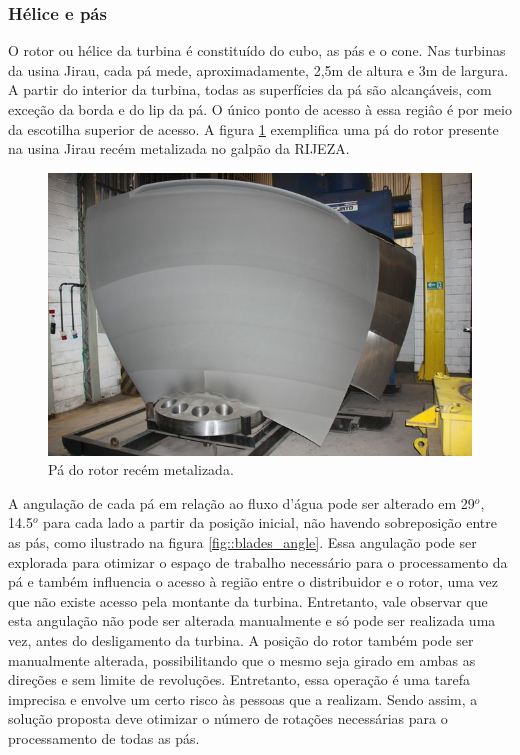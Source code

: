 \subsubsection{Hélice e pás}
 
O rotor ou hélice da turbina é constituído do cubo, as pás e o cone. 
Nas turbinas da usina Jirau, cada pá mede, aproximadamente, 2,5m de altura e
3m de largura. A partir do interior da turbina, todas as superfícies da pá são
alcançáveis, com exceção da borda e do lip da pá. O único ponto de acesso à
essa regiâo é por meio da escotilha superior de acesso. A figura
\ref{fig::blade_rijeza} exemplifica uma pá do rotor presente na usina Jirau recém metalizada no galpão da RIJEZA.

\begin{figure}[h!]
	\centering	
	\includegraphics[width=0.7\columnwidth]{sota/figs/viagem/img_4887}
	\caption{Pá do rotor recém metalizada.}
	\label{fig::blade_rijeza}
\end{figure}

A angulação de cada pá em relação ao fluxo d'água pode ser alterado em 29$^o$,
14.5$^o$ para cada lado a partir da posição inicial, não havendo sobreposição
entre as pás, como ilustrado na figura \ref{fig::blades_angle}.
Essa angulação pode ser explorada para otimizar o espaço de trabalho necessário
para o processamento da pá e também influencia o acesso à região
entre o distribuidor e o rotor, uma vez que não existe acesso pela montante da
turbina. Entretanto, vale observar que esta angulação não pode ser alterada
manualmente e só pode ser realizada uma vez, antes do desligamento da turbina. A
posição do rotor também pode ser manualmente alterada, possibilitando que o mesmo seja girado em ambas as direções e sem limite de revoluções. Entretanto, essa operação é uma tarefa imprecisa e envolve um certo risco às pessoas que a realizam. Sendo
assim, a solução proposta deve otimizar o número de rotações necessárias para o processamento de todas as pás.

